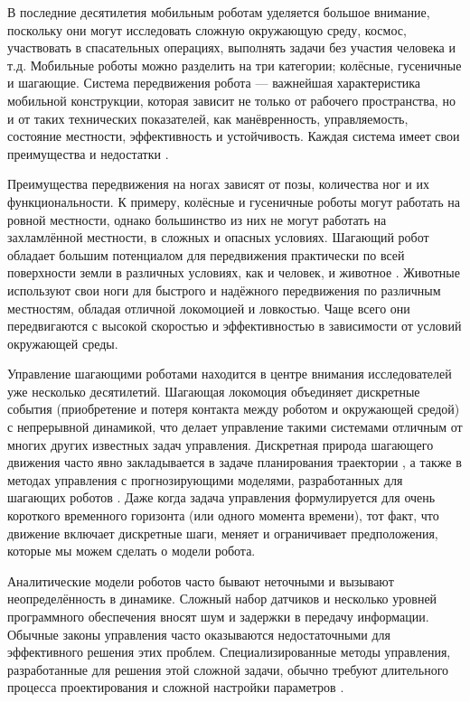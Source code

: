 {\actuality} 

В последние десятилетия мобильным роботам уделяется большое внимание, поскольку они могут исследовать сложную окружающую среду, космос, участвовать в спасательных операциях, выполнять задачи без участия человека и т.д. Мобильные роботы можно разделить на три категории; колёсные, гусеничные и шагающие. Система передвижения робота --- важнейшая характеристика мобильной конструкции, которая зависит не только от рабочего пространства, но и от таких технических показателей, как манёвренность, управляемость, состояние местности, эффективность и устойчивость. Каждая система имеет свои преимущества и недостатки \cite{zhong2019}.

Преимущества передвижения на ногах зависят от позы, количества ног и их функциональности. К примеру, колёсные и гусеничные роботы могут работать на ровной местности, однако большинство из них не могут работать на захламлённой местности, в сложных и опасных условиях. Шагающий робот обладает большим потенциалом для передвижения практически по всей поверхности земли в различных условиях, как и человек, и животное \cite{Silva2012}. Животные используют свои ноги для быстрого и надёжного передвижения по различным местностям, обладая отличной локомоцией и ловкостью. Чаще всего они передвигаются с высокой скоростью и эффективностью в зависимости от условий окружающей среды.

Управление шагающими роботами находится в центре внимания исследователей уже несколько десятилетий. Шагающая локомоция объединяет дискретные события (приобретение и потеря контакта между роботом и окружающей средой) с непрерывной динамикой, что делает управление такими системами отличным от многих других известных задач управления. Дискретная природа шагающего движения часто явно закладывается в задаче планирования траектории \cite{katayama2022whole, lu2023whole}, а также в методах управления с прогнозирующими моделями, разработанных для шагающих роботов \cite{KIM2019, chignoli2021humanoid}. Даже когда задача управления формулируется для очень короткого временного горизонта (или одного момента времени), тот факт, что движение включает дискретные шаги, меняет и ограничивает предположения, которые мы можем сделать о модели робота.

Аналитические модели роботов часто бывают неточными и вызывают неопределённость в динамике. Сложный набор датчиков и несколько уровней программного обеспечения вносят шум и задержки в передачу информации. Обычные законы управления часто оказываются недостаточными для эффективного решения этих проблем. Специализированные методы управления, разработанные для решения этой сложной задачи, обычно требуют длительного процесса проектирования и сложной настройки параметров \cite{underactuated}. 

